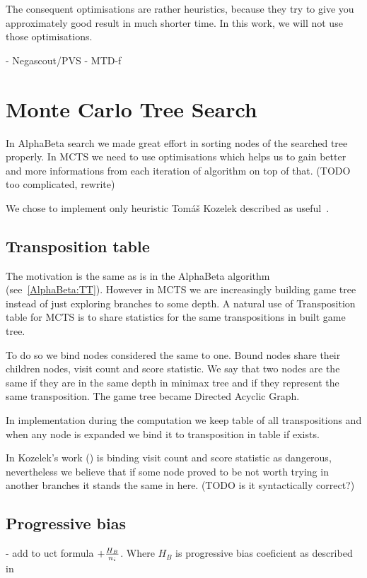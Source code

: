 The consequent optimisations are rather heuristics, because they try to
give you approximately good result in much shorter time. In this work, we
will not use those optimisations.


- Negascout/PVS
- MTD-f


\section{Monte Carlo Tree Search}
In AlphaBeta search we made great effort in sorting nodes of the searched tree
properly. In MCTS we need to use optimisations which helps us to gain better
and more informations from each iteration of algorithm on top of that.
(TODO too complicated, rewrite)

We chose to implement only heuristic Tomáš Kozelek described as
useful~\cite{KOZELEK}.

\subsection{Transposition table}
The motivation is the same as is in the AlphaBeta algorithm
(see~\ref{AlphaBeta:TT}). However in MCTS we are increasingly building game
tree instead of just exploring branches to some depth. A natural use of
Transposition table for MCTS is to share statistics for the same transpositions
in built game tree.

To do so we bind nodes considered the same to one. Bound nodes share their
children nodes, visit count and score statistic. We say that two nodes are the
same if they are in the same depth in minimax tree and if they represent the
same transposition. The game tree became Directed Acyclic Graph.

In implementation during the computation we keep table of all transpositions
and when any node is expanded we bind it to transposition in table if exists.

In Kozelek's work (\cite{KOZELEK}) is binding visit count and score statistic
as dangerous, nevertheless we believe that if some node proved to be not worth
trying in another branches it stands the same in here. (TODO is it
syntactically correct?)

\subsection{Progressive bias}
- add to uct formula $+ {H_B \over n_i}$. Where $H_B$ is progressive bias
coeficient as described in 
\cite{progressive-strategies}
